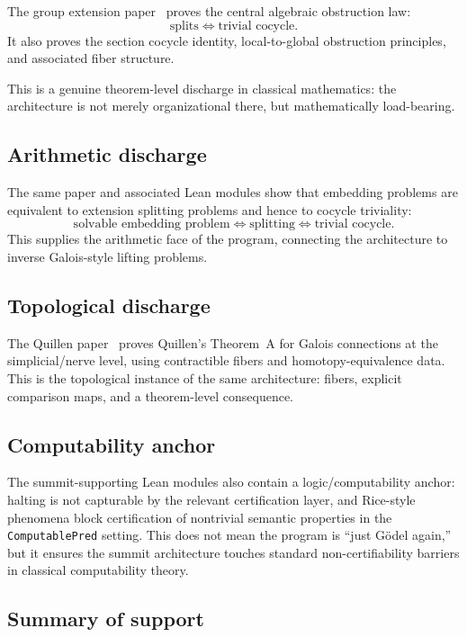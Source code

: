 \documentclass[11pt]{article}
\begin{document}
The group extension paper~\cite{SpivackFiber} proves the central algebraic
obstruction law:
\[
\text{splits} \iff \text{trivial cocycle}.
\]
It also proves the section cocycle identity, local-to-global obstruction
principles, and associated fiber structure.

This is a genuine theorem-level discharge in classical mathematics: the
architecture is not merely organizational there, but mathematically load-bearing.

\subsection{Arithmetic discharge}

The same paper and associated Lean modules show that embedding problems are
equivalent to extension splitting problems and hence to cocycle triviality:
\[
\text{solvable embedding problem}
\iff
\text{splitting}
\iff
\text{trivial cocycle}.
\]
This supplies the arithmetic face of the program, connecting the architecture to
inverse Galois-style lifting problems.

\subsection{Topological discharge}

The Quillen paper~\cite{SpivackQuillen} proves Quillen's Theorem~A for Galois
connections at the simplicial/nerve level, using contractible fibers and
homotopy-equivalence data. This is the topological instance of the same
architecture: fibers, explicit comparison maps, and a theorem-level consequence.

\subsection{Computability anchor}

The summit-supporting Lean modules also contain a logic/computability anchor:
halting is not capturable by the relevant certification layer, and Rice-style
phenomena block certification of nontrivial semantic properties in the
\texttt{ComputablePred} setting. This does not mean the program is ``just
G\"odel again,'' but it ensures the summit architecture touches standard
non-certifiability barriers in classical computability theory.

\subsection{Summary of support}
\end{document}

